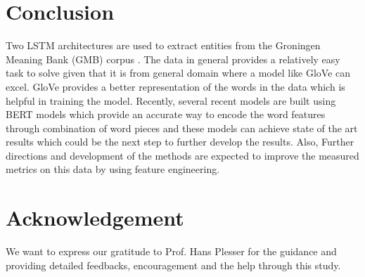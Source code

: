 \documentclass[sigconf, nonacm, natbib, screen, balance=False]{acmart}
\begin{document}
\section{Conclusion}\label{sec:conclusion}
Two LSTM architectures are used to extract entities from the Groningen Meaning Bank (GMB) corpus \citep{Bos2017GMB}. The data in general provides a relatively easy task to solve given that it is from general domain where a model like GloVe can excel. GloVe provides a better representation of the words in the data which is helpful in training the model. Recently, several recent models are built using BERT models which provide an accurate way to encode the word features through combination of word pieces and these models can achieve state of the art results which could be the next step to further develop the results. Also, Further directions and development of the methods are expected to improve the measured metrics on this data by using feature engineering. 

\section{Acknowledgement}\label{sec:akns}
We want to express our gratitude to Prof. Hans Plesser for the guidance and providing detailed feedbacks, encouragement and the help through this study.





\end{document}
